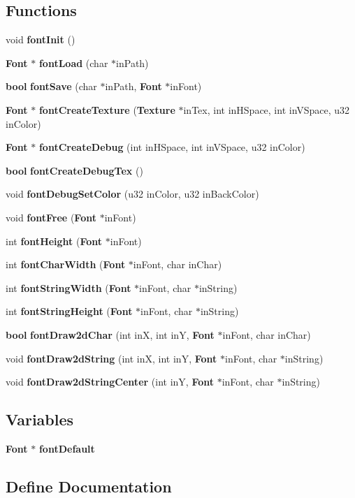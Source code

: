 \subsection*{Functions}
\begin{CompactItemize}
\item 
void {\bf font\-Init} ()
\item 
{\bf Font} $\ast$ {\bf font\-Load} (char $\ast$in\-Path)
\item 
{\bf bool} {\bf font\-Save} (char $\ast$in\-Path, {\bf Font} $\ast$in\-Font)
\item 
{\bf Font} $\ast$ {\bf font\-Create\-Texture} ({\bf Texture} $\ast$in\-Tex, int in\-HSpace, int in\-VSpace, u32 in\-Color)
\item 
{\bf Font} $\ast$ {\bf font\-Create\-Debug} (int in\-HSpace, int in\-VSpace, u32 in\-Color)
\item 
{\bf bool} {\bf font\-Create\-Debug\-Tex} ()
\item 
void {\bf font\-Debug\-Set\-Color} (u32 in\-Color, u32 in\-Back\-Color)
\item 
void {\bf font\-Free} ({\bf Font} $\ast$in\-Font)
\item 
int {\bf font\-Height} ({\bf Font} $\ast$in\-Font)
\item 
int {\bf font\-Char\-Width} ({\bf Font} $\ast$in\-Font, char in\-Char)
\item 
int {\bf font\-String\-Width} ({\bf Font} $\ast$in\-Font, char $\ast$in\-String)
\item 
int {\bf font\-String\-Height} ({\bf Font} $\ast$in\-Font, char $\ast$in\-String)
\item 
{\bf bool} {\bf font\-Draw2d\-Char} (int in\-X, int in\-Y, {\bf Font} $\ast$in\-Font, char in\-Char)
\item 
void {\bf font\-Draw2d\-String} (int in\-X, int in\-Y, {\bf Font} $\ast$in\-Font, char $\ast$in\-String)
\item 
void {\bf font\-Draw2d\-String\-Center} (int in\-Y, {\bf Font} $\ast$in\-Font, char $\ast$in\-String)
\end{CompactItemize}
\subsection*{Variables}
\begin{CompactItemize}
\item 
{\bf Font} $\ast$ {\bf font\-Default}
\end{CompactItemize}


\subsection{Define Documentation}
